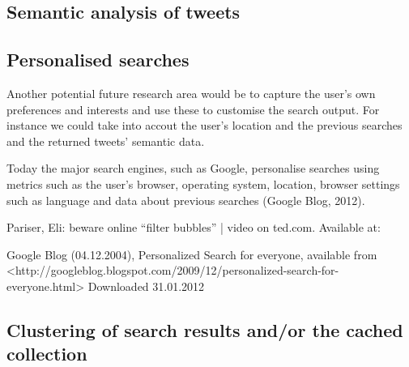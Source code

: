 \subsection{Semantic analysis of tweets} %

\subsection{Personalised searches} %
Another potential future research area would be to capture the user's own preferences and interests and use these to customise the search output. For instance we could take into accout the user's location and the previous searches and the returned tweets' semantic data.

Today the major search engines, such as Google, personalise searches using metrics such as the user's browser, operating system, location, browser settings such as language and data about previous searches (Google Blog, 2012).

Pariser, Eli: beware online “filter bubbles” | video on ted.com. Available at: %

Google Blog (04.12.2004), Personalized Search for everyone, available from <http://googleblog.blogspot.com/2009/12/personalized-search-for-everyone.html> Downloaded 31.01.2012

\subsection{Clustering of search results and/or the cached collection} %